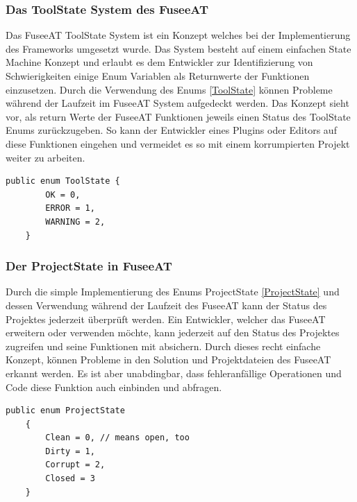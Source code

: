 \documentclass[pagesize, paper=a4, fontsize=12pt, titlepage=true, headings=small, headnosepline, abstractoff, liststotoc, nochapterprefix, plainheadsepline, twoside]{scrreprt}
\begin{document}
\subsubsection{Das ToolState System des FuseeAT}
Das FuseeAT ToolState System ist ein Konzept welches bei der Implementierung des Frameworks umgesetzt wurde. Das System besteht auf einem einfachen State Machine Konzept und erlaubt es dem Entwickler zur Identifizierung von Schwierigkeiten einige Enum Variablen als Returnwerte der Funktionen einzusetzen. Durch die Verwendung des Enums \ref{ToolState} können Probleme während der Laufzeit im FuseeAT System aufgedeckt werden. Das Konzept sieht vor, als return Werte der FuseeAT Funktionen jeweils einen Status des ToolState Enums zurückzugeben. So kann der Entwickler eines Plugins oder Editors auf diese Funktionen eingehen und vermeidet es so mit einem korrumpierten Projekt weiter zu arbeiten.
\begin{lstlisting}[label=ToolState, caption=ToolState System unterstützt beim verbessern der Stabilität des FuseeAT.]
    public enum ToolState {
        OK = 0,
        ERROR = 1,
        WARNING = 2,
    }
\end{lstlisting}

\subsubsection{Der ProjectState in FuseeAT}
Durch die simple Implementierung des Enums ProjectState \ref{ProjectState} und dessen Verwendung während der Laufzeit des FuseeAT kann der Status des Projektes jederzeit überprüft werden. Ein Entwickler, welcher das FuseeAT erweitern oder verwenden möchte, kann jederzeit auf den Status des Projektes zugreifen und seine Funktionen mit absichern. Durch dieses recht einfache Konzept, können Probleme in den Solution und Projektdateien des FuseeAT erkannt werden. Es ist aber unabdingbar, dass fehleranfällige Operationen und Code diese Funktion auch einbinden und abfragen.
\begin{lstlisting}[caption=Code des ProjectState Enums. Wird in FuseeAT verwendet um die Integrität eines Projekts zu erhalten., label=ProjectState]
    public enum ProjectState
    {
        Clean = 0, // means open, too
        Dirty = 1,
        Corrupt = 2,
        Closed = 3
    }
\end{lstlisting}


\end{document}
